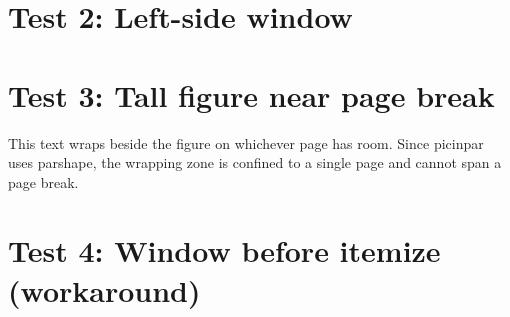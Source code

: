 \section{Test 2: Left-side window}

\begin{window}
  \lipsum[2-3]
\end{window}

%
%
\section{Test 3: Tall figure near page break}

\lipsum[4-5]

\begin{window}
  This text wraps beside the figure on whichever page has room.
  Since picinpar uses parshape, the wrapping zone is confined to
  a single page and cannot span a page break.
  \lipsum[6-7]
\end{window}

\section{Test 4: Window before itemize (workaround)}

